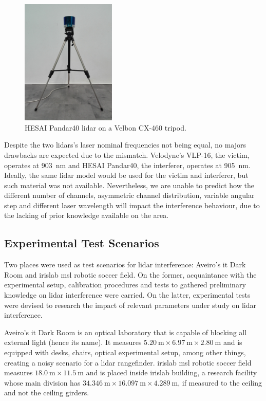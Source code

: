 \begin{figure}[H]
\centering
\includegraphics[width=0.4\textwidth]{img/experimental-setup/pandar40-on-tripod.jpg}
\caption{HESAI Pandar40 \ac{lidar} on a Velbon CX-460 tripod.}
\label{fig:pandar40-on-tripod}
\end{figure}

Despite the two \acp{lidar}'s laser nominal frequencies not being equal, no majors drawbacks are expected due to the mismatch. Velodyne's VLP-16, the victim, operates at \SI{903}{\nano\meter} and HESAI Pandar40, the interferer, operates at \SI{905}{\nano\meter}. Ideally, the same \ac{lidar} model would be used for the victim and interferer, but such material was not available. Nevertheless, we are unable to predict how the different number of channels, asymmetric channel distribution, variable angular step and different laser wavelength will impact the interference behaviour, due to the lacking of prior knowledge available on the area.

\subsection{Experimental Test Scenarios}
\label{subsec:lidar-interference:test-scenarios}

Two places were used as test scenarios for \ac{lidar} interference: Aveiro's \ac{it} Dark Room and \ac{irislab} \ac{msl} robotic soccer field. On the former, acquaintance with the experimental setup, calibration procedures and tests to gathered preliminary knowledge on \ac{lidar} interference were carried. On the latter, experimental tests were devised to research the impact of relevant parameters under study on \ac{lidar} interference. 

Aveiro's \ac{it} Dark Room is an optical laboratory that is capable of blocking all external light (hence its name). It measures $\SI{5.20}{\meter} \times \SI{6.97}{\meter} \times \SI{2.80}{\meter}$ and is equipped with desks, chairs, optical experimental setup, among other things, creating a noisy scenario for a \ac{lidar} rangefinder. 
\ac{irislab} \ac{msl} robotic soccer field measures $\SI{18.0}{\meter} \times \SI{11.5}{\meter}$ and is placed inside \ac{irislab} building, a research facility whose main division has $\SI{34.346}{\meter} \times \SI{16.097}{\meter} \times \SI{4.289}{\meter}$, if measured to the ceiling and not the ceiling girders. 

